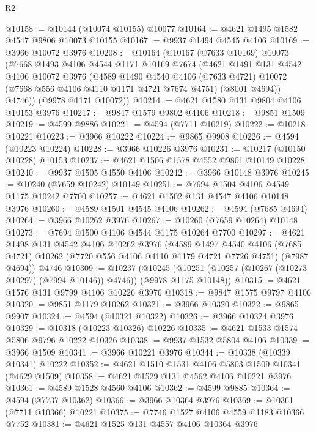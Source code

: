 \begin{lexlean}{R2}
\begin{coremodule}
@10158 := @10144 (@10074 @10155) @10077
@10164 := @4621 @1495 @1582 @4547 @9806 @10073 @10155
@10167 := @9937 @1494 @4545 @4106
@10169 := @3966 @10072 @3976
@10208 := @10164
    (@10167
      (@7633 @10169)
      @10073
      (@7668
        @1493
        @4106
        @4544
        @1171
        @10169
        @7674
        (@4621
          @1491
          @131
          @4542
          @4106
          @10072
          @3976
          (@4589
            @1490
            @4540
            @4106
            (@7633 @4721)
            @10072
            (@7668 @556 @4106 @4110 @1171 @4721 @7674 @4751)
            (@8001 @4694))
          @4746))
      (@9978 @1171 @10072))
@10214 := @4621 @1580 @131 @9804 @4106 @10153 @3976
@10217 := @9847 @1579 @9802 @4106
@10218 := @9851 @1509
@10219 := @4599 @9886
@10221 := @4594 (@7711 @10219)
@10222 := @10218 @10221
@10223 := @3966 @10222
@10224 := @9865 @9908
@10226 := @4594 (@10223 @10224)
@10228 := @3966 @10226 @3976
@10231 := @10217 (@10150 @10228) @10153
@10237 := @4621 @1506 @1578 @4552 @9801 @10149 @10228
@10240 := @9937 @1505 @4550 @4106
@10242 := @3966 @10148 @3976
@10245 := @10240 (@7659 @10242) @10149
@10251 := @7694 @1504 @4106 @4549 @1175 @10242 @7700
@10257 := @4621 @1502 @131 @4547 @4106 @10148 @3976
@10260 := @4589 @1501 @4545 @4106
@10262 := @4594 (@7685 @4694)
@10264 := @3966 @10262 @3976
@10267 := @10260 (@7659 @10264) @10148
@10273 := @7694 @1500 @4106 @4544 @1175 @10264 @7700
@10297 := @4621
    @1498
    @131
    @4542
    @4106
    @10262
    @3976
    (@4589
      @1497
      @4540
      @4106
      (@7685 @4721)
      @10262
      (@7720 @556 @4106 @4110 @1179 @4721 @7726 @4751)
      (@7987 @4694))
    @4746
@10309 := @10237
    (@10245 (@10251 (@10257 (@10267 (@10273 @10297) (@7994 @10146)) @4746)) (@9978 @1175 @10148))
@10315 := @4621 @1576 @131 @9799 @4106 @10226 @3976
@10318 := @9847 @1575 @9797 @4106
@10320 := @9851 @1179 @10262
@10321 := @3966 @10320
@10322 := @9865 @9907
@10324 := @4594 (@10321 @10322)
@10326 := @3966 @10324 @3976
@10329 := @10318 (@10223 @10326) @10226
@10335 := @4621 @1533 @1574 @5806 @9796 @10222 @10326
@10338 := @9937 @1532 @5804 @4106
@10339 := @3966 @1509
@10341 := @3966 @10221 @3976
@10344 := @10338 (@10339 @10341) @10222
@10352 := @4621 @1510 @1531 @4106 @5803 @1509 @10341 (@4629 @1509)
@10358 := @4621 @1529 @131 @4562 @4106 @10221 @3976
@10361 := @4589 @1528 @4560 @4106
@10362 := @4599 @9885
@10364 := @4594 (@7737 @10362)
@10366 := @3966 @10364 @3976
@10369 := @10361 (@7711 @10366) @10221
@10375 := @7746 @1527 @4106 @4559 @1183 @10366 @7752
@10381 := @4621 @1525 @131 @4557 @4106 @10364 @3976

\end{coremodule}
\end{lexlean}
